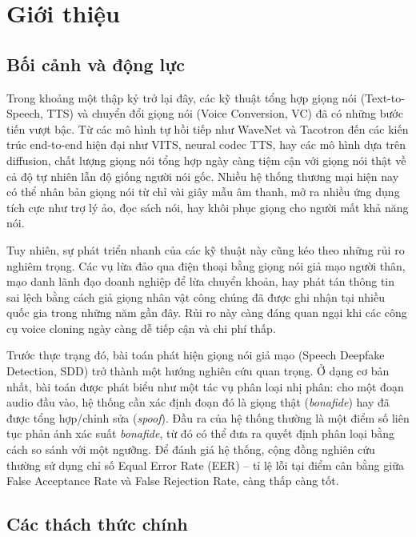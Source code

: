 ﻿\chapter{Giới thiệu} \label{chap:intro}

\section{Bối cảnh và động lực}

Trong khoảng một thập kỷ trở lại đây, các kỹ thuật tổng hợp giọng nói (Text-to-Speech, TTS) và chuyển đổi giọng nói (Voice Conversion, VC) đã có những bước tiến vượt bậc. Từ các mô hình tự hồi tiếp như WaveNet và Tacotron đến các kiến trúc end-to-end hiện đại như VITS, neural codec TTS, hay các mô hình dựa trên diffusion, chất lượng giọng nói tổng hợp ngày càng tiệm cận với giọng nói thật về cả độ tự nhiên lẫn độ giống người nói gốc. Nhiều hệ thống thương mại hiện nay có thể nhân bản giọng nói từ chỉ vài giây mẫu âm thanh, mở ra nhiều ứng dụng tích cực như trợ lý ảo, đọc sách nói, hay khôi phục giọng cho người mất khả năng nói.

Tuy nhiên, sự phát triển nhanh của các kỹ thuật này cũng kéo theo những rủi ro nghiêm trọng. Các vụ lừa đảo qua điện thoại bằng giọng nói giả mạo người thân, mạo danh lãnh đạo doanh nghiệp để lừa chuyển khoản, hay phát tán thông tin sai lệch bằng cách giả giọng nhân vật công chúng đã được ghi nhận tại nhiều quốc gia trong những năm gần đây. Rủi ro này càng đáng quan ngại khi các công cụ voice cloning ngày càng dễ tiếp cận và chi phí thấp.

Trước thực trạng đó, bài toán phát hiện giọng nói giả mạo (Speech Deepfake Detection, SDD) trở thành một hướng nghiên cứu quan trọng. Ở dạng cơ bản nhất, bài toán được phát biểu như một tác vụ phân loại nhị phân: cho một đoạn audio đầu vào, hệ thống cần xác định đoạn đó là giọng thật (\textit{bonafide}) hay đã được tổng hợp/chỉnh sửa (\textit{spoof}). Đầu ra của hệ thống thường là một điểm số liên tục phản ánh xác suất \textit{bonafide}, từ đó có thể đưa ra quyết định phân loại bằng cách so sánh với một ngưỡng. Để đánh giá hệ thống, cộng đồng nghiên cứu thường sử dụng chỉ số Equal Error Rate (EER) -- tỉ lệ lỗi tại điểm cân bằng giữa False Acceptance Rate và False Rejection Rate, càng thấp càng tốt.

\section{Các thách thức chính}

